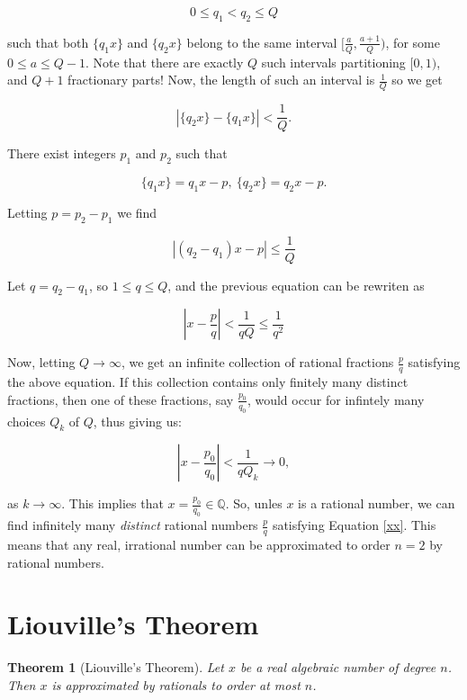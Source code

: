 \documentclass[12pt,letterpaper]{report}
\newcommand\be{\begin{equation}}
\newcommand\ee{\end{equation}}
\newcommand{\Q}{\mathbb{Q}}
\newtheorem{thm}{Theorem}[section]
\begin{document}
\be 0\leq q_1<q_2\leq Q \ee

such that both $\{q_1x\}$ and $\{q_2x\}$ belong to the same
interval $[\frac{a}{Q},\frac{a+1}{Q})$, for some $0\leq a\leq
Q-1$. Note that there are exactly $Q$ such intervals partitioning
$[0,1)$, and $Q+1$ fractionary parts! Now, the length of such an
interval is $\frac{1}{Q}$ so we get

\be \left|\{q_2x\}-\{q_1x\}\right|< \frac{1}{Q}. \ee

There exist integers $p_1$ and $p_2$ such that

\be \{q_1 x\} = q_1x - p, \ \{q_2 x\} = q_2 x - p. \ee

Letting $p = p_2 - p_1$ we find

\be \left|(q_2-q_1)x-p\right|\leq \frac{1}{Q} \ee

Let $q =q_2-q_1$, so $1\leq q\leq Q$, and the previous equation
can be rewriten as

\be \label{xx} \left|x-\frac{p}{q}\right|< \frac{1}{qQ}\leq
\frac{1}{q^2} \ee

Now, letting $Q\rightarrow \infty$, we get an infinite collection
of rational fractions $\frac{p}{q}$ satisfying the above equation.
If this collection contains only finitely many distinct fractions,
then one of these fractions, say $\frac{p_0}{q_0}$, would occur
for infintely many choices $Q_k$ of $Q$, thus giving us:

\be \left|x-\frac{p_0}{q_0}\right|< \frac{1}{qQ_k} \rightarrow 0,
\ee

as $k\rightarrow \infty$. This implies that $x=\frac{p_0}{q_0}\in
\Q$. So, unles $x$ is a rational number, we can find infinitely
many \textit{distinct} rational numbers $\frac{p}{q}$ satisfying
Equation \ref{xx}. This means that any real, irrational  number
can be approximated to order $n=2$ by rational numbers.


\section{Liouville's Theorem}

\begin{thm}[Liouville's Theorem] Let $x$ be a real algebraic number
of degree $n$. Then $x$ is approximated by rationals to order at
most $n$.
\end{thm}
\end{document}
